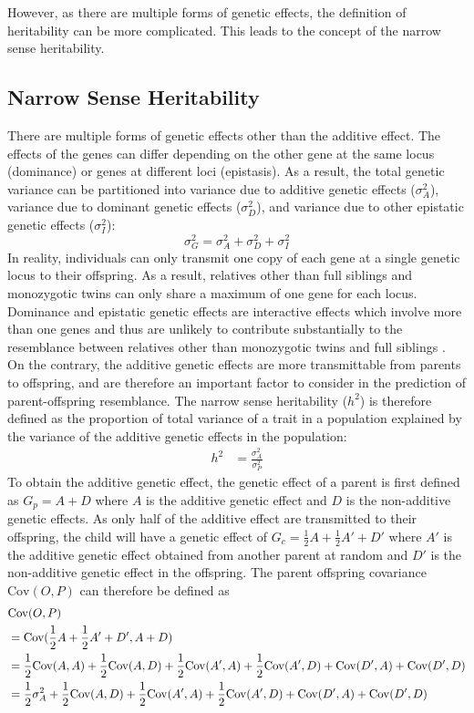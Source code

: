\documentclass[12pt]{scrbook}
\begin{document}
However, as there are multiple forms of genetic effects, the definition of heritability can be more complicated. 
This leads to the concept of the narrow sense heritability.

\subsection{Narrow Sense Heritability}
There are multiple forms of genetic effects other than the additive effect. 
The effects of the genes can differ depending on the other gene at the same locus (dominance) or genes at different loci (epistasis).
As a result, the total genetic variance can be partitioned into variance due to additive genetic effects ($\sigma_A^2$), variance due to dominant genetic effects ($\sigma_D^2$), and variance due to other epistatic genetic effects ($\sigma_I^2$):
$$
\sigma_G^2=\sigma_A^2+\sigma_D^2+\sigma_I^2
$$
In reality, individuals can only transmit one copy of each gene at a single genetic locus to their offspring. 
As a result, relatives other than full siblings and monozygotic twins can only share a maximum of one gene for each locus. 
Dominance and epistatic genetic effects are interactive effects which involve more than one genes and thus are unlikely to contribute substantially to the resemblance between relatives other than monozygotic twins and full siblings \citep{Visscher2008}.
On the contrary, the additive genetic effects are more transmittable from parents to offspring, and are therefore an important factor to consider in the prediction of parent-offspring resemblance. 
The narrow sense heritability ($h^2$) is therefore defined as the proportion of total variance of a trait in a population explained by the variance of the additive genetic effects in the population:
\begin{align}
h^2&=\frac{\sigma_A^2}{\sigma_P^2}
\label{eq:narrowHeritability}
\end{align}
To obtain the additive genetic effect, the genetic effect of a parent is first defined as $G_p=A+D$ where $A$ is the additive genetic effect and $D$ is the non-additive genetic effects.
As only half of the additive effect are transmitted to their offspring, the child will have a genetic effect of $G_c=\frac{1}{2}A+\frac{1}{2}A'+D'$ where $A'$ is the additive genetic effect obtained from another parent at random and $D'$ is the non-additive genetic effect in the offspring.
The parent offspring covariance $\mathrm{Cov}(O,P)$ can therefore be defined as
\begin{align}
&\mathrm{Cov}(O,P)\\
&= \mathrm{Cov}(\frac{1}{2}A+\frac{1}{2}A'+D', A+D)  \notag\\
&=\frac{1}{2}\mathrm{Cov}(A, A)+\frac{1}{2}\mathrm{Cov}(A, D)+\frac{1}{2}\mathrm{Cov}(A', A)+\frac{1}{2}\mathrm{Cov}(A', D)+\mathrm{Cov}(D', A)+\mathrm{Cov}(D', D)\notag\\
&=\frac{1}{2}\sigma_A^2+\frac{1}{2}\mathrm{Cov}(A, D)+\frac{1}{2}\mathrm{Cov}(A', A)+\frac{1}{2}\mathrm{Cov}(A', D)+\mathrm{Cov}(D', A)+\mathrm{Cov}(D', D) 
\label{eq:halfCompletedCovOP}
\end{align} 
\end{document}

